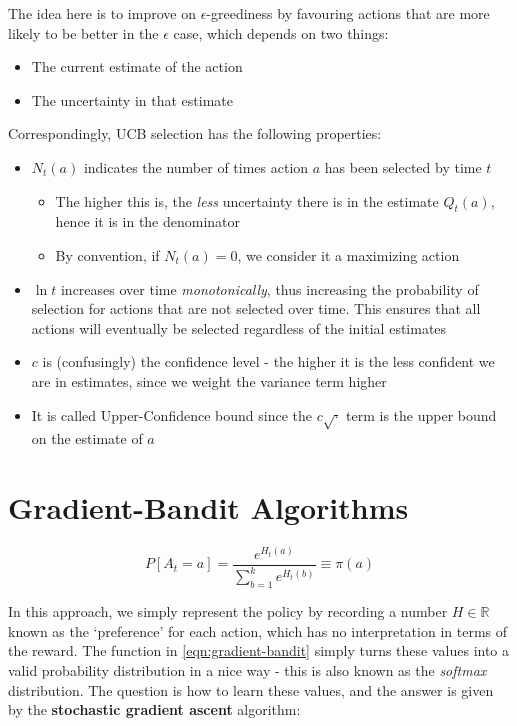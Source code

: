 \documentclass[11pt]{report}
\begin{document}
The idea here is to improve on $\epsilon$-greediness by favouring actions that are more likely to be better in the $\epsilon$ case, which depends on two things:
\begin{itemize}
	\item The current estimate of the action
	\item The uncertainty in that estimate
\end{itemize}

Correspondingly, UCB selection has the following properties:

\begin{itemize}
	\item $N_t(a)$ indicates the number of times action $a$ has been selected by time $t$
	\begin{itemize}
		\item The higher this is, the \textit{less} uncertainty there is in the estimate $Q_t(a)$, hence it is in the denominator
		\item By convention, if $N_t(a)=0$, we consider it a maximizing action
	\end{itemize}
	\item $\ln{t}$ increases over time \textit{monotonically}, thus increasing the probability of selection for actions that are not selected over time. This ensures that all actions will eventually be selected regardless of the initial estimates
	\item $c$ is (confusingly) the confidence level - the higher it is the less confident we are in estimates, since we weight the variance term higher
	\item It is called Upper-Confidence bound since the $c\sqrt{\cdot}$ term is the upper bound on the estimate of $a$
\end{itemize}



\section{Gradient-Bandit Algorithms}
\begin{equation}
	\label{eqn:gradient-bandit}
	P[A_t = a] = \frac{e^{H_t(a)}}{\sum_{b=1}^k e^{H_t(b)}} \equiv \pi(a)
\end{equation}

In this approach, we simply represent the policy by recording a number $H \in \mathbb{R}$ known as the `preference' for each action, which has no interpretation in terms of the reward. The function in \autoref{eqn:gradient-bandit} simply turns these values into a valid probability distribution in a nice way - this is also known as the \textit{softmax} distribution. The question is how to learn these values, and the answer is given by the \textbf{stochastic gradient ascent} algorithm:
\end{document}
